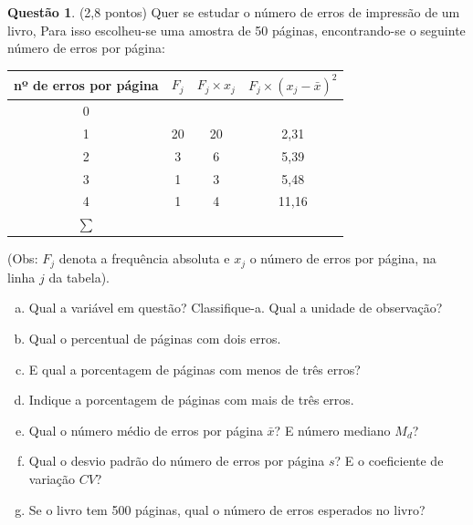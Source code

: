 \documentclass[a4paper,11pt]{article}
\theoremstyle{definition}
\newtheorem{exe}{Questão}
\begin{document}
\medskip
\medskip
\begin{exe} (2,8 pontos)
Quer se estudar o número de erros de impressão de um livro, Para isso escolheu-se uma
amostra de 50 páginas, encontrando-se o seguinte número de erros por página:

\begin{center}
 \begin{tabular}{c|c|c|c}
 \hline
 nº de erros por página & $F_j$ & $F_j \times x_j$ & $F_j \times (x_j - \bar{x})^2$ \\
 \hline
 0 &    &    & \\
 1 & 20 & 20 & 2,31\\
 2 & 3  & 6  & 5,39\\
 3 & 1  & 3  & 5,48\\
 4 & 1  & 4  & 11,16\\
 \hline
 $\sum$ &  &  & \\
 \hline
 \end{tabular}
\end{center}
(Obs: $F_j$ denota a frequência absoluta e $x_j$ o número de erros por página, na linha $j$ da tabela).

\begin{enumerate}[(a)]
  \item Qual a variável em questão? Classifique-a. Qual a unidade de observação? \\
  \item Qual o percentual de páginas com dois erros. \\
  \item E qual a porcentagem de páginas com menos de três erros? \\
  \item Indique a porcentagem de páginas com mais de três erros. \\
  \item Qual o número médio de erros por página $\bar{x}$? E número mediano $M_d$? \\
  \item Qual o desvio padrão do número de erros por página $s$? E o coeficiente de variação $CV$? \\
  \item Se o livro tem 500 páginas, qual o número de erros esperados no livro? \\
\end{enumerate}
\end{exe}
\end{document}
